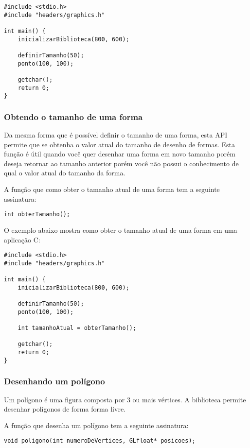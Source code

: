 \documentclass[12pt, %
openright,
oneside, %
a4paper,    %
brazil]{facom-ufu-abntex2}
\begin{document}
\begin{lstlisting}
#include <stdio.h>
#include "headers/graphics.h"

int main() {
    inicializarBiblioteca(800, 600);

    definirTamanho(50);
    ponto(100, 100);

    getchar();
    return 0;
}
\end{lstlisting}

\subsubsection{Obtendo o tamanho de uma forma}
Da mesma forma que é possível definir o tamanho de uma forma, esta API permite que se obtenha o valor atual do tamanho de desenho de formas. Esta função é útil quando você quer desenhar uma forma em novo tamanho porém deseja retornar ao tamanho anterior porém você não possui o conhecimento de qual o valor atual do tamanho da forma.

A função que como obter o tamanho atual de uma forma tem a seguinte assinatura:

\begin{lstlisting}
int obterTamanho();
\end{lstlisting}

O exemplo abaixo mostra como obter o tamanho atual de uma forma em uma aplicação C:

\begin{lstlisting}
#include <stdio.h>
#include "headers/graphics.h"

int main() {
    inicializarBiblioteca(800, 600);

    definirTamanho(50);
    ponto(100, 100);

    int tamanhoAtual = obterTamanho();

    getchar();
    return 0;
}
\end{lstlisting}

\subsubsection{Desenhando um polígono}
Um polígono é uma figura composta por 3 ou mais vértices. A biblioteca permite desenhar polígonos de forma forma livre.

A função que desenha um polígono tem a seguinte assinatura:

\begin{lstlisting}
void poligono(int numeroDeVertices, GLfloat* posicoes);
\end{lstlisting}
\end{document}
